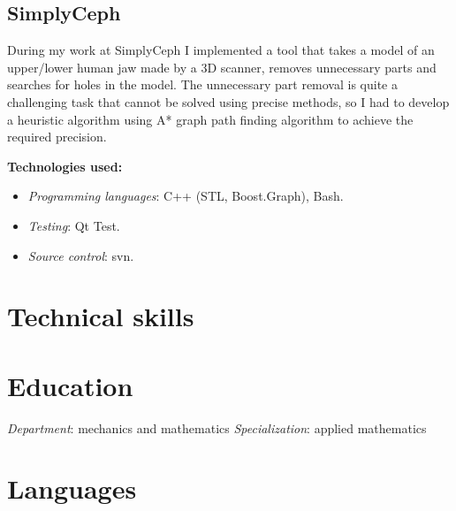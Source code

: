 \documentclass[11pt,a4paper]{moderncv}
\begin{document}
\bigskip
\subsection{SimplyCeph}
  During my work at SimplyCeph I implemented a tool that takes a model of an upper/lower human jaw made by a 3D scanner, removes unnecessary parts and searches for holes in the model.
  The unnecessary part removal is quite a challenging task that cannot be solved using precise methods, so I had to develop a heuristic algorithm using A* graph path finding algorithm to achieve the required precision.

  \medskip
  \textbf{Technologies used:}
  \smallskip
  \begin{itemize}
    \item \textit{Programming languages}: C++ (STL, Boost.Graph), Bash.
    \item \textit{Testing}: Qt Test.
    \item \textit{Source control}: svn.
  \end{itemize}


\bigskip
\section{Technical skills}

\section{Education}
  {\medskip\textit{Department}: mechanics and mathematics}
  {\medskip\textit{Specialization}: applied mathematics}{}

\section{Languages}

\renewcommand{\listitemsymbol}{-~}
\end{document}
